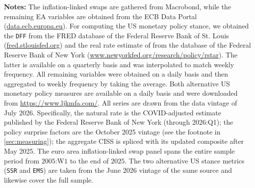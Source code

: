\begin{table}[!htbp]
{\begin{tabular}{llllll}
\bottomrule
\end{tabular}}
\begin{minipage}{\textwidth}
\vspace{0.1cm}
\scriptsize \textbf{Notes:} The inflation-linked swaps are gathered from Macrobond, while the remaining EA variables are obtained from the ECB Data Portal (\href{https://data.ecb.europa.eu/}{data.ecb.europa.eu}).  For computing the US monetary policy stance, we obtained the \texttt{DFF} from the FRED database of the Federal Reserve Bank of St. Louis (\href{https://fred.stlouisfed.org}{fred.stlouisfed.org}) and the real rate estimate of \cite{laubach2003measuring} from the database of the Federal Reserve Bank of New York (\href{https://www.newyorkfed.org/research/policy/rstar}{www.newyorkfed.org/research/policy/rstar}). The latter is available on a quarterly basis and was interpolated to match weekly frequency. All remaining variables were obtained on a daily basis and then aggregated to weekly frequency by taking the average. Both alternative US monetary policy measures are available on a daily basis and were downloaded from \href{https://www.ljkmfa.com/}{https://www.ljkmfa.com/}. All series are drawn from the data vintage of July 2026. Specifically, the natural rate is the COVID-adjusted estimate published by the Federal Reserve Bank of New York (through 2026:Q1); the policy surprise factors are the October 2025 vintage (see the footnote in \autoref{sec:measuring}); the aggregate CISS is spliced with its updated composite after May 2025. The euro area inflation-linked swap panel spans the entire sample period from $2005$:W$1$ to the end of $2025$. The two alternative US stance metrics (\texttt{SSR} and \texttt{EMS}) are taken from the June 2026 vintage of the same source and likewise cover the full sample.
\end{minipage}
\end{table}




